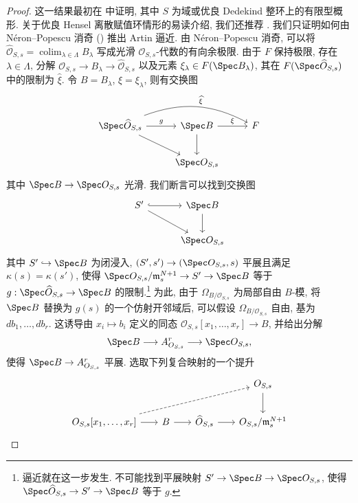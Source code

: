 \begin{proof}
这一结果最初在 \cite[推论 $2.2$]{Art69a} 中证明, 其中 $S$ 为域或优良 Dedekind 整环上的有限型概形. 关于优良 Hensel 离散赋值环情形的易读介绍, 我们还推荐 \cite[\S$3.6$]{BLR90}. 我们只证明如何由 Néron--Popescu 消奇 () 推出 Artin 逼近. 由 Néron--Popescu 消奇, 可以将 $\widehat{\mathcal O}_{S,s}=\operatorname{colim}_{\lambda\in\Lambda}B_\lambda$ 写成光滑 $\mathcal O_{S,s}$-代数的有向余极限. 由于 $F$ 保持极限, 存在 $\lambda\in\Lambda$, 分解 $\mathcal O_{S,s}\to B_\lambda\to\widehat{\mathcal O}_{S,s}$ 以及元素 $\xi_\lambda\in F(\Spec B_\lambda)$, 其在 $F(\Spec\widehat{\mathcal O}_{S,s})$ 中的限制为 $\widehat\xi$. 令 $B=B_\lambda$, $\xi=\xi_\lambda$, 则有交换图
\[
\begin{tikzcd}[column sep=2.6em,row sep=2.1em]
\Spec\widehat{\mathcal O}_{S,s}\arrow[r,"g"]\arrow[rr,bend left=24,"\widehat\xi"]\arrow[dr]&\Spec B\arrow[r,"\xi"]\arrow[d]&F\\
&\Spec\mathcal O_{S,s}&
\end{tikzcd}
\]
其中 $\Spec B\to\Spec\mathcal O_{S,s}$ 光滑. 我们断言可以找到交换图
\begin{equation}\label{src:B.5.19}
\begin{tikzcd}[column sep=3em,row sep=2em]
S'\arrow[r,hook]\arrow[dr]&\Spec B\arrow[d]\\
&\Spec\mathcal O_{S,s}
\end{tikzcd}
\end{equation}
其中 $S'\hookrightarrow\Spec B$ 为闭浸入, $(S',s')\to(\Spec\mathcal O_{S,s},s)$ 平展且满足 $\kappa(s)=\kappa(s')$, 使得 $\Spec\mathcal O_{S,s}/\mathfrak m_s^{N+1}\to S'\to\Spec B$ 等于 $g:\Spec\widehat{\mathcal O}_{S,s}\to\Spec B$ 的限制.\setcounter{footnote}{4}\footnote{逼近就在这一步发生. 不可能找到平展映射 $S'\to\Spec B\to\Spec\mathcal O_{S,s}$, 使得 $\Spec\widehat{\mathcal O}_{S,s}\to S'\to\Spec B$ 等于 $g$.}
为此, 由于 $\Omega_{B/\mathcal O_{S,s}}$ 为局部自由 $B$-模, 将 $\Spec B$ 替换为 $g(s)$ 的一个仿射开邻域后, 可以假设 $\Omega_{B/\mathcal O_{S,s}}$ 自由, 基为 $db_1,\ldots,db_r$. 这诱导由 $x_i\mapsto b_i$ 定义的同态 $\mathcal O_{S,s}[x_1,\ldots,x_r]\to B$, 并给出分解
\[
\Spec B\longrightarrow\mathbb A^r_{\mathcal O_{S,s}}\longrightarrow\Spec\mathcal O_{S,s},
\]
使得 $\Spec B\to\mathbb A^r_{\mathcal O_{S,s}}$ 平展. 选取下列复合映射的一个提升
\[
\begin{tikzcd}[column sep=1.8em,row sep=2em]
&&&\mathcal O_{S,s}\arrow[d]\\
\mathcal O_{S,s}[x_1,\ldots,x_r]\arrow[r]\arrow[rrru,dashed]&B\arrow[r]&\widehat{\mathcal O}_{S,s}\arrow[r]&\mathcal O_{S,s}/\mathfrak m_s^{N+1}

\end{tikzcd}\]
\end{proof}
